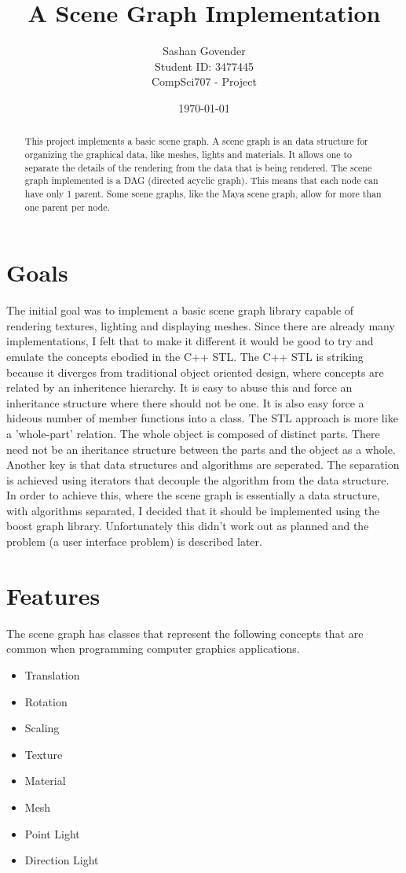 \documentclass{article}
\begin{document}
\title{\bfseries A Scene Graph Implementation}
\date{\today}
\author{Sashan Govender \\
Student ID: 3477445 \\
CompSci707 - Project} 
\maketitle
\begin{abstract}
This project implements a basic scene graph. A scene graph is an data structure
for organizing the graphical data, like meshes, lights and materials. It allows
one to separate the details of the rendering from the data that is being rendered.
The scene graph implemented is a DAG (directed acyclic graph). This means that each node can
have only 1 parent. Some scene graphs, like the Maya scene graph, allow for more than one parent
per node.  
\end{abstract}
\section{Goals}
The initial goal was to implement a basic scene graph library capable of
rendering textures, lighting and displaying meshes. Since there are already many
implementations, I felt that to make it different it would be good to try and
emulate the concepts ebodied in the C++ STL. The C++ STL is striking because it
diverges from traditional object oriented design, where concepts are related by
an inheritence hierarchy. It is easy to abuse this and force an inheritance
structure where there should not be one. It is also easy force a hideous number
of member functions into a class. The STL approach is more like a 'whole-part'
relation. The whole object is composed of distinct parts. There need not be an
iheritance structure between the parts and the object as a whole. Another key is
that data structures and algorithms are seperated. The separation is achieved
using iterators that decouple the algorithm from the data structure. In order to
achieve this, where the scene graph is essentially a data structure, with
algorithms separated, I decided that it should be implemented using the boost
graph library. Unfortunately this didn't work out as planned and the problem (a
user interface problem) is described later.
\section{Features}
The scene graph has classes that represent the following concepts that are
common when programming computer graphics applications.
\begin{itemize}
	\item Translation
    \item Rotation
    \item Scaling
    \item Texture    
    \item Material
    \item Mesh
    \item Point Light
    \item Direction Light     
\end{itemize}
\end{document}
